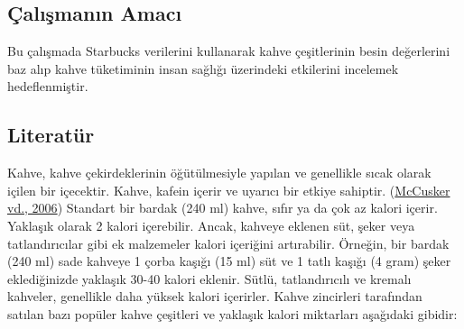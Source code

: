 \documentclass[
  12pt,
]{article}
\begin{document}
\hypertarget{uxe7alux131ux15fmanux131n-amacux131}{%
\subsection{Çalışmanın Amacı}\label{uxe7alux131ux15fmanux131n-amacux131}}

Bu çalışmada Starbucks verilerini kullanarak kahve çeşitlerinin besin değerlerini baz alıp kahve tüketiminin insan sağlığı üzerindeki etkilerini incelemek hedeflenmiştir.

\hypertarget{literatuxfcr}{%
\subsection{Literatür}\label{literatuxfcr}}

Kahve, kahve çekirdeklerinin öğütülmesiyle yapılan ve genellikle sıcak olarak içilen bir içecektir. Kahve, kafein içerir ve uyarıcı bir etkiye sahiptir. (\protect\hyperlink{ref-mccusker2006caffeine}{McCusker vd., 2006}) Standart bir bardak (240 ml) kahve, sıfır ya da çok az kalori içerir. Yaklaşık olarak 2 kalori içerebilir. Ancak, kahveye eklenen süt, şeker veya tatlandırıcılar gibi ek malzemeler kalori içeriğini artırabilir. Örneğin, bir bardak (240 ml) sade kahveye 1 çorba kaşığı (15 ml) süt ve 1 tatlı kaşığı (4 gram) şeker eklediğinizde yaklaşık 30-40 kalori eklenir.
Sütlü, tatlandırıcılı ve kremalı kahveler, genellikle daha yüksek kalori içerirler. Kahve zincirleri tarafından satılan bazı popüler kahve çeşitleri ve yaklaşık kalori miktarları aşağıdaki gibidir:
\end{document}
